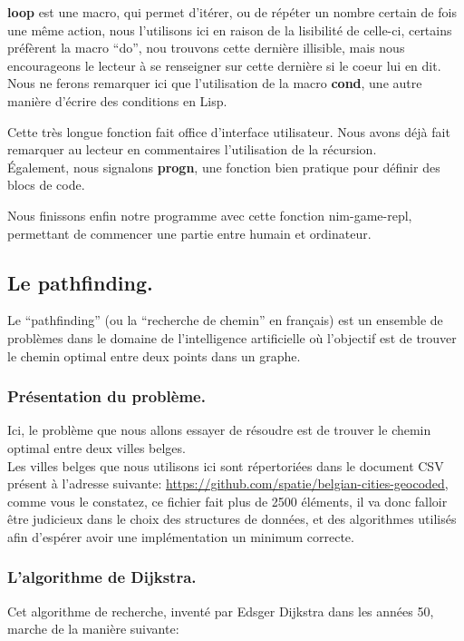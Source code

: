 \documentclass[a4paper, 12pt]{article}
\numberwithin{equation}{subsection}
\begin{document}
{\bf loop} est une macro, qui permet d'itérer, ou de répéter un nombre certain de fois une même action, nous l'utilisons ici en raison de la lisibilité de celle-ci, certains préfèrent la macro ``do'', nou trouvons cette dernière illisible, mais nous encourageons le lecteur à se renseigner sur cette dernière si le coeur lui en dit.\\

Nous ne ferons remarquer ici que l'utilisation de la macro {\bf cond}, une autre manière d'écrire des conditions en Lisp.

Cette très longue fonction fait office d'interface utilisateur. Nous avons déjà fait remarquer au lecteur en commentaires l'utilisation de la récursion. \\

Également, nous signalons {\bf progn}, une fonction bien pratique pour définir des blocs de code.

Nous finissons enfin notre programme avec cette fonction nim-game-repl, permettant de commencer une partie entre humain et ordinateur.
\subsection{Le pathfinding.}
Le ``pathfinding'' (ou la ``recherche de chemin'' en français) est un ensemble de problèmes dans le domaine de l'intelligence artificielle où l'objectif est de trouver le chemin optimal entre deux points dans un graphe. \\
\subsubsection{Présentation du problème.}
Ici, le problème que nous allons essayer de résoudre est de trouver le chemin optimal entre deux villes belges. \\

Les villes belges que nous utilisons ici sont répertoriées dans le document CSV présent à l'adresse suivante: \url{https://github.com/spatie/belgian-cities-geocoded},
comme vous le constatez, ce fichier fait plus de 2500 éléments, il va donc falloir être judicieux dans le choix des structures de données, et des algorithmes utilisés afin d'espérer avoir une implémentation un minimum correcte. \\[0.2cm]
\subsubsection{L'algorithme de Dijkstra.}
Cet algorithme de recherche, inventé par Edsger Dijkstra dans les années 50, marche de la manière suivante: \\
\end{document}
